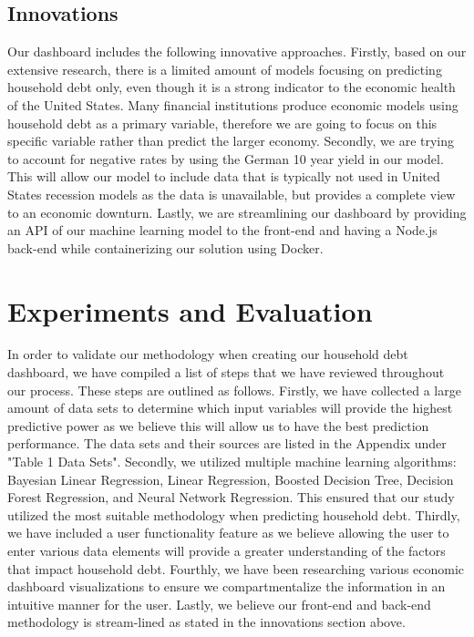 \documentclass[sigconf,nonacm,11pt]{acmart}
\begin{document}
\vspace{-0.5em}


\subsection{Innovations}

Our dashboard includes the following innovative approaches. Firstly, based on our extensive research, there is a limited amount of models focusing on predicting household debt only, even though it is a strong indicator to the economic health of the United States. Many financial institutions produce economic models using household debt as a primary variable, therefore we are going to focus on this specific variable rather than predict the larger economy. Secondly, we are trying to account for negative rates by using the German 10 year yield in our model. This will allow our model to include data that is typically not used in United States recession models as the data is unavailable, but provides a complete view to an economic downturn. Lastly, we are streamlining our dashboard by providing an API of our machine learning model to the front-end and having a Node.js back-end while containerizing our solution using Docker.\vspace{-0.5em}

\section{Experiments and Evaluation}
In order to validate our methodology when creating our household debt dashboard, we have compiled a list of steps that we have reviewed throughout our process. These steps are outlined as follows. Firstly, we have collected a large amount of data sets to determine which input variables will provide the highest predictive power as we believe this will allow us to have the best prediction performance. The data sets and their sources are listed in the Appendix under "Table 1 Data Sets". Secondly, we utilized multiple machine learning algorithms: Bayesian Linear Regression, Linear Regression, Boosted Decision Tree, Decision Forest Regression, and Neural Network Regression. This ensured that our study utilized the most suitable methodology when predicting household debt. Thirdly, we have included a user functionality feature as we believe allowing the user to enter various data elements will provide a greater understanding of the factors that impact household debt. Fourthly, we have been researching various economic dashboard visualizations to ensure we compartmentalize the information in an intuitive manner for the user. Lastly, we believe our front-end and back-end methodology is stream-lined as stated in the innovations section above. 
\end{document}
